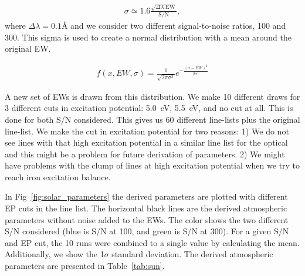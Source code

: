 \documentclass{aa}
\begin{document}
\begin{align}
    \sigma \simeq 1.6 \frac{\sqrt{\Delta\lambda\; \mathrm{EW}}}{\mathrm{S/N}},
\end{align}
where $\Delta\lambda=0.1\si{\angstrom}$ and we consider two different
signal-to-noise ratios, 100 and 300. This sigma is used to create a
normal distribution with a mean around the original EW.

\begin{align}
    f(x, EW, \sigma) = \frac{1}{\sqrt{2\pi\sigma^2}} e^{-\frac{(x-EW)^2}{2\sigma^2}}
\end{align}

A new set of EWs is drawn from this distribution. We make 10 different
draws for 3 different cuts in excitation potential: \SI{5.0}{eV},
\SI{5.5}{eV}, and no cut at all. This is done for both S/N considered.
This gives us 60 different line-lists plus the original line-list. We
make the cut in excitation potential for two reasons: 1) We do not see
lines with that high excitation potential in a similar line list for the
optical \citep[see e.g.][]{Tsantaki2013} and this might be a problem for
future derivation of parameters. 2) We might have problems with the clump
of lines at high excitation potential when we try to reach iron excitation
balance.

In Fig~\ref{fig:solar_parameters} the derived parameters are plotted
with different EP cuts in the line list. The horizontal black lines
are the derived atmospheric parameters without noise added to the EWs.
The color shows the two different S/N considered (blue is S/N at 100,
and green is S/N at 300). For a given S/N and EP cut, the 10 runs were
combined to a single value by calculating the mean. Additionally,
we show the 1$\sigma$ standard deviation. The derived atmospheric
parameters are presented in Table~\ref{tab:sun}.
\end{document}
